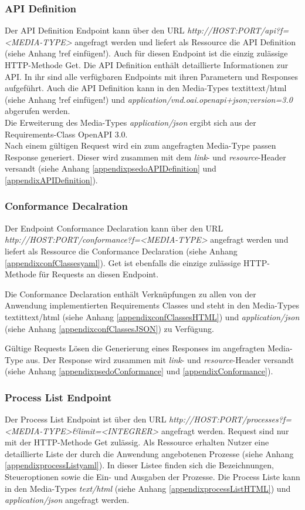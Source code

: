 \subsubsection{API Definition}
Der API Definition Endpoint kann über den URL \textit{http://HOST:PORT/api?f=<MEDIA-TYPE>} angefragt werden und liefert als Ressource die API Definition 
(siehe Anhang !ref einfügen!). Auch für diesen Endpoint ist die einzig zulässige HTTP-Methode Get. 
Die API Definition enthält detaillierte Informationen zur API. In ihr sind alle verfügbaren Endpoints mit ihren Parametern und Responses aufgeführt. Auch die API Definition kann in den Media-Types
textit{text/html} (siehe Anhang !ref einfügen!) und \textit{application/vnd.oai.openapi+json;version=3.0} abgerufen werden.\\
Die Erweiterung des Media-Types \textit{application/json} ergibt sich aus der Requirements-Class OpenAPI 3.0.\\
Nach einem gültigen Request wird ein zum angefragten Media-Type passen Response generiert. 
Dieser wird zusammen mit dem \textit{link}- und \textit{resource}-Header versandt (siehe Anhang \ref{appendixpsedoAPIDefinition} und \ref{appendixAPIDefinition}). 


\subsubsection{Conformance Decalration}
Der Endpoint Conformance Declaration kann über den URL \textit{http://HOST:PORT/conformance?f=<MEDIA-TYPE>} angefragt werden und liefert als 
Ressource die Conformance Declaration (siehe Anhang \ref{appendixconfClassesyaml}). Get ist ebenfalls die einzige zulässige HTTP-Methode für Requests an diesen Endpoint.

Die Conformance Declaration enthält Verknüpfungen zu allen von der Anwendung implementierten Requirements Classes und steht in den Media-Types textit{text/html} (siehe Anhang \ref{appendixconfClassesHTML}) und 
\textit{application/json} (siehe Anhang \ref{appendixconfClassesJSON}) zu Verfügung.

Gültige Requests Lösen die Generierung eines Responses im angefragten Media-Type aus. 
Der Response wird zusammen mit \textit{link}- und \textit{resource}-Header versandt (siehe Anhang \ref{appendixpsedoConformance} und \ref{appendixConformance}).



\subsubsection{Process List Endpoint}
Der Process List Endpoint ist über den URL \textit{http://HOST:PORT/processes?f=<MEDIA-TYPE>\&limit=<INTEGRER>} angefragt werden. 
Request sind nur mit der HTTP-Methode Get zulässig. Als Ressource erhalten Nutzer eine detaillierte Liste der durch die Anwendung angebotenen 
Prozesse (siehe Anhang \ref{appendixprocessListyaml}). In dieser Listee finden sich die Bezeichnungen, 
Steueroptionen sowie die Ein- und Ausgaben der Prozesse. Die Process Liste kann in den Media-Types \textit{text/html} (siehe Anhang \ref{appendixprocessListHTML}) 
und \textit{application/json} angefragt werden. 

